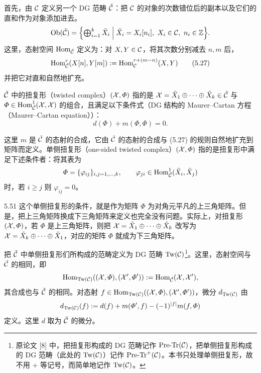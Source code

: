  首先，由 $\mathcal{C}$ 定义另一个 DG 范畴 $\tilde{\mathcal{C}}$：把 $\mathcal{C}$ 的对象的次数错位后的副本以及它们的直和作为对象添加进去。
\[
  \operatorname{Ob}(\tilde{\mathcal{C}}) = \Bigl\{\textstyle\bigoplus_{i=1}^{k}\tilde{X}_{i} \Bigm| \tilde{X}_{i} = X_{i}[n_{i}],\ X_{i} \in \mathcal{C},\ n_{i} \in \mathbb{Z}\Bigr\}.
\]
这里，态射空间 $\operatorname{Hom}_{\tilde{\mathcal{C}}}$ 定义为：对 $X,Y \in \mathcal{C}$，将其次数分别减去 $n,m$ 后，
\begin{equation}
  \operatorname{Hom}^{r}_{\tilde{\mathcal{C}}}(X[n], Y[m]) := \operatorname{Hom}^{r+(m-n)}_{\mathcal{C}}(X,Y) \tag{5.27}
\end{equation}
并把它对直和自然地扩充。

 $\tilde{\mathcal{C}}$ 中的扭复形（twisted complex）$(\mathcal{X}, \varPhi)$ 指的是 $\mathcal{X} = \tilde{X}_{1}\oplus\cdots\oplus\tilde{X}_{k} \in \tilde{\mathcal{C}}$ 与 $\varPhi \in \operatorname{Hom}^{1}_{\tilde{\mathcal{C}}}(\mathcal{X},\mathcal{X})$ 的组合，且满足以下条件式（DG 结构的 Maurer–Cartan 方程（Maurer–Cartan equation））：
\[
  d(\varPhi) + m(\varPhi,\varPhi) = 0.
\]

这里 $m$ 是 $\tilde{\mathcal{C}}$ 的态射的合成，它由 $\tilde{\mathcal{C}}$ 的态射的合成与 (5.27) 的规则自然地扩充到矩阵而定义。单侧扭复形（one-sided twisted complex）$(\mathcal{X},\varPhi)$ 指的是扭复形中满足下述条件者：将其表为
\[
  \varPhi = \{\varphi_{ij}\}_{i,j=1,\ldots,k}, \qquad \varphi_{ji} \in \operatorname{Hom}^{1}_{\tilde{\mathcal{C}}}(\tilde{X}_{i},\tilde{X}_{j})
\]
时，若 $i \ge j$ 则 $\varphi_{ij} = 0$。

\begin{remark}{5.51} 这个单侧扭复形的条件，就是作为矩阵 $\varPhi$ 为对角元平凡的上三角矩阵。但是，把上三角矩阵换成下三角矩阵来定义也完全没有问题。实际上，对扭复形 $(\mathcal{X},\varPhi)$，若 $\varPhi$ 是上三角矩阵，则把 $\mathcal{X} = \tilde{X}_{1}\oplus\cdots\oplus\tilde{X}_{k}$ 改写为 $\mathcal{X} = \tilde{X}_{k}\oplus\cdots\oplus\tilde{X}_{1}$，对应的矩阵 $\varPhi$ 就成为下三角矩阵。\end{remark}

 把 $\tilde{\mathcal{C}}$ 中单侧扭复形们所构成的范畴定义为 DG 范畴 $\mathrm{Tw}(\mathcal{C})$\footnote{原论文 [8] 中，把扭复形构成的 DG 范畴记作 $\mathrm{Pre\text{-}Tr}(\mathcal{C})$，把单侧扭复形构成的 DG 范畴（此处的 $\mathrm{Tw}(\mathcal{C})$）记作 $\mathrm{Pre\text{-}Tr}^{+}(\mathcal{C})$。本书只处理单侧扭复形，故不用 $+$ 等记号，而简单地记作 $\mathrm{Tw}(\mathcal{C})$。}。这里，态射空间与 $\tilde{\mathcal{C}}$ 的相同，即
\[
  \operatorname{Hom}_{\mathrm{Tw}(\mathcal{C})}((\mathcal{X},\varPhi),(\mathcal{X}',\varPhi')) := \operatorname{Hom}_{\tilde{\mathcal{C}}}(\mathcal{X},\mathcal{X}'),
\]
其合成也与 $\tilde{\mathcal{C}}$ 的相同。对态射 $f \in \operatorname{Hom}_{\mathrm{Tw}(\mathcal{C})}((\mathcal{X},\varPhi),(\mathcal{X}',\varPhi'))$，微分 $d_{\mathrm{Tw}(\mathcal{C})}$ 由
\[
  d_{\mathrm{Tw}(\mathcal{C})}(f) := d(f) + m(\varPhi',f) - (-1)^{|f|}m(f,\varPhi)
\]
定义。这里 $d$ 取为 $\tilde{\mathcal{C}}$ 的微分。

